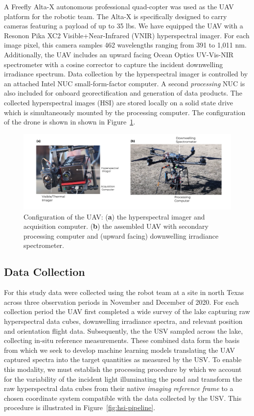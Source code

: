 \documentclass[journal,article,submit,pdftex,moreauthors]{Definitions/mdpi}
\begin{document}
A Freefly Alta-X autonomous professional quad-copter was used as the UAV platform for the robotic team. The Alta-X is specifically designed to carry cameras featuring a payload of up to 35 lbs. We have equipped the UAV with a Resonon Pika XC2 Visible+Near-Infrared (VNIR) hyperspectral imager. For each image pixel, this camera samples 462 wavelengths ranging from 391 to 1,011 nm.  Additionally, the UAV includes an upward facing Ocean Optics UV-Vis-NIR spectrometer with a cosine corrector to capture the incident downwelling irradiance spectrum. Data collection by the hyperspectral imager is controlled by an attached Intel NUC small-form-factor computer. A second \textit{processing} NUC is also included for onboard georectification and generation of data products. The collected hyperspectral images (HSI) are stored locally on a solid state drive which is simultaneously mounted by the processing computer. The configuration of the drone is shown in shown in Figure~\ref{fig:drone-components}.


\begin{figure}[H]
\includegraphics[width=\columnwidth]{paper/figures/materials-and-methods/annotated-drone.pdf}
\caption{Configuration of the UAV: (\textbf{a}) the hyperspectral imager and acquisition computer. (\textbf{b}) the assembled UAV with secondary processing computer and (upward facing) downwelling irradiance spectrometer. \label{fig:drone-components}}
\end{figure} 


\subsection{Data Collection}

For this study data were collected using the robot team at a site in north Texas across three observation periods in November and December of 2020. For each collection period the UAV first completed a wide survey of the lake capturing raw hyperspectral data cubes, downwelling irradiance spectra, and relevant position and orientation flight data. Subsequently, the the USV sampled across the lake, collecting in-situ reference measurements. These combined data form the basis from which we seek to develop machine learning models translating the UAV captured spectra into the target quantities as measured by the USV. To enable this modality, we must establish the processing procedure by which we account for the variability of the incident light illuminating the pond and transform the raw hyperspectral data cubes from their native \textit{imaging reference frame} to a chosen coordinate system compatible with the data collected by the USV. This procedure is illustrated in Figure~\ref{fig:hsi-pipeline}.
\end{document}
